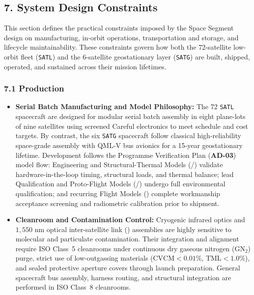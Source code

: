 \subsection{7. System Design Constraints}

This section defines the practical constraints imposed by the Space Segment design on manufacturing, in-orbit operations, transportation and storage, and lifecycle maintainability. These constraints govern how both the 72-satellite low-orbit fleet (\texttt{SATL}) and the 6-satellite geostationary layer (\texttt{SATG}) are built, shipped, operated, and sustained across their mission lifetimes.

\subsubsection{7.1 Production}

\begin{itemize}[leftmargin=*, itemsep=0.35em, topsep=0.25em]
    \item \textbf{Serial Batch Manufacturing and Model Philosophy:} The 72 \texttt{SATL} spacecraft are designed for modular serial batch assembly in eight plane-lots of nine satellites using screened Careful  electronics to meet schedule and cost targets. By contrast, the six \texttt{SATG} spacecraft follow classical high-reliability space-grade assembly with QML-V bus avionics for a 15-year geostationary lifetime. Development follows the Programme Verification Plan (\textbf{AD-03}) model flow: Engineering and Structural-Thermal Models (/) validate hardware-in-the-loop timing, structural loads, and thermal balance; lead Qualification and Proto-Flight Models (/) undergo full environmental qualification; and recurring Flight Models () complete workmanship acceptance screening and radiometric calibration prior to shipment.
    \item \textbf{Cleanroom and Contamination Control:} Cryogenic infrared optics and $1{,}550\text{ nm}$ optical inter-satellite link () assemblies are highly sensitive to molecular and particulate contamination. Their integration and alignment require ISO Class~5 cleanrooms under continuous dry gaseous nitrogen ($\mathrm{GN_2}$) purge, strict use of low-outgassing materials ($\text{CVCM} < 0.01\%$, $\text{TML} < 1.0\%$), and sealed protective aperture covers through launch preparation. General spacecraft bus assembly, harness routing, and structural integration are performed in ISO Class~8 cleanrooms.
\end{itemize}

